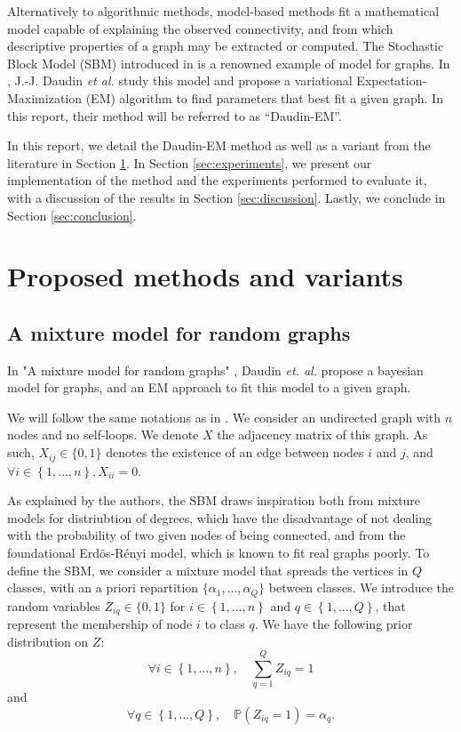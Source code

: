 \documentclass[switch, 12pt]{article}
\begin{document}
\begin{multicols}{2}
    Alternatively to algorithmic methods, model-based methods fit a mathematical model capable of explaining the observed connectivity, and from which descriptive properties of a graph may be extracted or computed. The Stochastic Block Model (SBM) introduced in \cite{snijders_estimation_1997} is a renowned example of model for graphs. In \cite{main_article}, J.-J. Daudin \textit{et al.} study this model and propose a variational Expectation-Maximization (EM) algorithm to find parameters that best fit a given graph. In this report, their method will be referred to as ``Daudin-EM''.

    In this report, we detail the Daudin-EM method as well as a variant from the literature in Section \ref{sec:method}. In Section \ref{sec:experiments}, we present our implementation of the method and the experiments performed to evaluate it, with a discussion of the results in Section \ref{sec:discussion}. Lastly, we conclude in Section \ref{sec:conclusion}.


    \section{Proposed methods and variants}
    \label{sec:method}

    \subsection{A mixture model for random graphs \cite{main_article}}
    \label{subsec:mixture_model}
    In "A mixture model for random graphs" \cite{main_article}, Daudin \textit{et. al.} propose a bayesian model for graphs, and an EM approach to fit this model to a given graph.

    We will follow the same notations as in \cite{main_article}. We consider an undirected graph with $n$ nodes and no self-loops. We denote $X$ the adjacency matrix of this graph. As such, $X_{ij}\in \{0,1\}$ denotes the existence of an edge between nodes $i$ and $j$, and $\forall i\in \left\{1,\dots,n\right\}, X_{ii}=0$.

    As explained by the authors, the SBM draws inspiration both from mixture models for distriubtion of degrees, which have the disadvantage of not dealing with the probability of two given nodes of being connected, and from the foundational Erdös-Rényi model, which is known to fit real graphs poorly. To define the SBM, we consider a mixture model that spreads the vertices in $Q$ classes, with an a priori repartition $\{\alpha_1, \dots, \alpha_Q\}$ between classes. We introduce the random variables $Z_{iq} \in \{0,1\}$ for $i\in \left\{1,\dots,n\right\}$ and $q\in \left\{1,\dots,Q\right\}$, that represent the membership of node $i$ to class $q$. We have the following prior distribution on $Z$:
    \begin{equation}
        \forall i\in \left\{1,\dots,n\right\}, \quad \sum_{q=1}^Q Z_{iq} = 1
    \end{equation}
    and
    \begin{equation}
        \label{eq:prior_Z}
        \forall q\in \left\{1,\dots,Q\right\},\quad \mathbb{P}(Z_{iq}=1)=\alpha_q.
    \end{equation}


\end{multicols}
\end{document}
